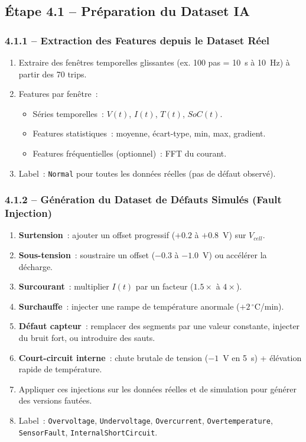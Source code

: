 \documentclass[a4paper,12pt]{article}
\begin{document}
\subsection{Étape 4.1 -- Préparation du Dataset IA}

\subsubsection{4.1.1 -- Extraction des Features depuis le Dataset Réel}
\begin{enumerate}[nosep]
  \item Extraire des fenêtres temporelles glissantes (ex. 100 pas = 10~s à 10~Hz) à partir des 70 trips.
  \item Features par fenêtre~:
    \begin{itemize}[nosep]
      \item Séries temporelles~: $V(t)$, $I(t)$, $T(t)$, $SoC(t)$.
      \item Features statistiques~: moyenne, écart-type, min, max, gradient.
      \item Features fréquentielles (optionnel)~: FFT du courant.
    \end{itemize}
  \item Label~: \texttt{Normal} pour toutes les données réelles (pas de défaut observé).
\end{enumerate}

\subsubsection{4.1.2 -- Génération du Dataset de Défauts Simulés (Fault Injection)}
\begin{enumerate}[nosep]
  \item \textbf{Surtension}~: ajouter un offset progressif ($+0.2$ à $+0.8$~V) sur $V_{cell}$.
  \item \textbf{Sous-tension}~: soustraire un offset ($-0.3$ à $-1.0$~V) ou accélérer la décharge.
  \item \textbf{Surcourant}~: multiplier $I(t)$ par un facteur ($1.5\times$ à $4\times$).
  \item \textbf{Surchauffe}~: injecter une rampe de température anormale ($+2\,^{\circ}$C/min).
  \item \textbf{Défaut capteur}~: remplacer des segments par une valeur constante, injecter du bruit fort, ou introduire des sauts.
  \item \textbf{Court-circuit interne}~: chute brutale de tension ($-1$~V en 5~s) + élévation rapide de température.
  \item Appliquer ces injections sur les données réelles et de simulation pour générer des versions fautées.
  \item Label~: \texttt{Overvoltage}, \texttt{Undervoltage}, \texttt{Overcurrent}, \texttt{Overtemperature}, \texttt{SensorFault}, \texttt{InternalShortCircuit}.
\end{enumerate}
\end{document}
